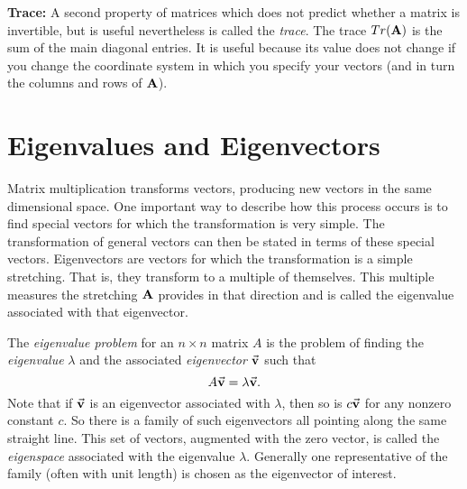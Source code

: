 \medskip
\noindent
{\bf Trace:}
A second property of matrices which does not predict whether a matrix is invertible, but
is useful nevertheless is called the \emph{trace}.  The trace $Tr{\left( {{\textbf{A}}} \right)}$ is the sum of
the main diagonal entries.  It is useful because its value does not change if you change
the coordinate system in which you specify your vectors (and in turn the columns and rows of ${\textbf{A}}$).

%
\section{Eigenvalues and Eigenvectors}
%
Matrix multiplication transforms vectors, producing new vectors in the 
same dimensional space.  
One important way to describe how this process occurs is to find special
vectors for which the transformation is very simple.  The transformation of
general vectors can then be stated in terms of these special
vectors.  Eigenvectors are vectors for which the transformation is a simple
stretching.  That is, they transform to a multiple of themselves.  This multiple
measures the stretching ${\textbf{A}}$ provides in that direction and is called the
eigenvalue associated with that eigenvector.

The \emph{eigenvalue problem}
for an $n \times n$ matrix $A$
is the problem of finding the \emph{eigenvalue} $\lambda$ and the associated 
\emph{eigenvector} $\vec{\textbf{v}}$ such that
\begin{equation}
    A\vec{\textbf{v}} = \lambda \vec{\textbf{v}}.
    \label{eqn:EIGVALPROB}
\end{equation}
Note that if $\vec{\textbf{v}}$ is an eigenvector associated with
$\lambda$, then so is $c\vec{\textbf{v}}$ for any nonzero constant $c$.
So there is a family of such eigenvectors all pointing along
the same straight line.  This set of vectors, augmented with the zero
vector, is called the \emph{eigenspace}
associated with the eigenvalue $\lambda$.  Generally one
representative of the family (often with unit length) is
chosen as the eigenvector of interest.

